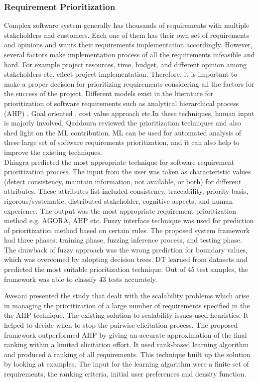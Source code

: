 \subsubsection{Requirement Prioritization}
Complex software system generally has thousands of requirements with multiple
stakeholders and customers. Each one of them has their own set of requirements
and opinions and wants their requirements implementation accordingly. However,
several factors make implementation process of all the requirements infeasible
and hard. For example project resources, time, budget, and different opinion among
stakeholders etc. effect project implementation. Therefore, it
is important to make a proper decision for prioritizing requirements considering
all the factors for the success of the project. Different models exist in the
literature for prioritization of software requirements such as analytical
hierarchical process (AHP) \cite{saaty2008}, Goal oriented
\cite{VanLamsweerde:2001}, cost value approach \cite{Karlsson:1997} etc.In these
techniques, human input is majorly involved. Qaddoura \etal \cite{RQaddoura}
reviewed the prioritization techniques and also shed light on the ML
contribution. ML can be used for automated analysis of these large set of
software requirements prioritization, and it can also help to improve the existing techniques.\\

	Dhingra \etal  \cite{S.Dhingra} predicted the most appropriate technique for
software requirement prioritization process. The input from the user was taken as characteristic values (detect consistency, maintain information, not available, or both) for different attributes. These attributes list included consistency,
traceability, priority basis, rigorous/systematic, distributed stakeholder,
cognitive aspects, and human experience. The output was the
most appropriate requirement prioritization method e.g. AGORA, AHP etc. Fuzzy interface technique was
used for prediction of prioritization method based on certain rules. The
proposed system framework had three phases; training phase, fuzzing inference
process, and testing phase. The drawback of fuzzy approach was the wrong prediction
for boundary values, which was overcomed by adopting decision trees. DT learned from datasets and
predicted the most suitable prioritization technique. Out of 45 test samples, the
framework was able to classify 43 tests accurately.

	Avesani \etal\cite{PAvesani} presented the study that dealt with the scalability
problems which arise in managing the prioritization of a large number of
requirements specified in the the AHP technique. The existing solution to
scalability issues used heuristics. It helped to decide when to stop the pairwise
elicitation process. The proposed framework outperformed AHP by giving an
accurate approximation of the final ranking within a limited elicitation effort. It used rank-based
learning algorithm and produced a ranking of all requirements. This technique
built up the solution by looking at examples. The input for the learning
algorithm were a finite set of requirements, the ranking criteria, initial user
preferences and density function.

